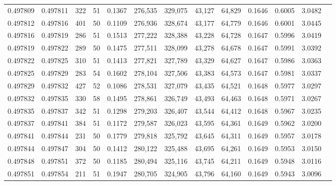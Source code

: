\begin{tabular}{rrrrrrrrrrrrr}
0.497809 & 0.497811 & 322 &  51 &                                     0.1367 & 276,535 & 329,075 &  43,127 &  64,829 & 0.1646 & 0.6005 & 3.0482 \\
0.497812 & 0.497816 & 401 &  50 &                                     0.1109 & 276,936 & 328,674 &  43,177 &  64,779 & 0.1646 & 0.6001 & 3.0445 \\
0.497816 & 0.497819 & 286 &  51 &                                     0.1513 & 277,222 & 328,388 &  43,228 &  64,728 & 0.1647 & 0.5996 & 3.0419 \\
0.497819 & 0.497822 & 289 &  50 &                                     0.1475 & 277,511 & 328,099 &  43,278 &  64,678 & 0.1647 & 0.5991 & 3.0392 \\
0.497822 & 0.497825 & 310 &  51 &                                     0.1413 & 277,821 & 327,789 &  43,329 &  64,627 & 0.1647 & 0.5986 & 3.0363 \\
0.497825 & 0.497829 & 283 &  54 &                                     0.1602 & 278,104 & 327,506 &  43,383 &  64,573 & 0.1647 & 0.5981 & 3.0337 \\
0.497829 & 0.497832 & 427 &  52 &                                     0.1086 & 278,531 & 327,079 &  43,435 &  64,521 & 0.1648 & 0.5977 & 3.0297 \\
0.497832 & 0.497835 & 330 &  58 &                                     0.1495 & 278,861 & 326,749 &  43,493 &  64,463 & 0.1648 & 0.5971 & 3.0267 \\
0.497835 & 0.497837 & 342 &  51 &                                     0.1298 & 279,203 & 326,407 &  43,544 &  64,412 & 0.1648 & 0.5967 & 3.0235 \\
0.497837 & 0.497841 & 384 &  51 &                                     0.1172 & 279,587 & 326,023 &  43,595 &  64,361 & 0.1649 & 0.5962 & 3.0200 \\
0.497841 & 0.497844 & 231 &  50 &                                     0.1779 & 279,818 & 325,792 &  43,645 &  64,311 & 0.1649 & 0.5957 & 3.0178 \\
0.497844 & 0.497847 & 304 &  50 &                                     0.1412 & 280,122 & 325,488 &  43,695 &  64,261 & 0.1649 & 0.5953 & 3.0150 \\
0.497848 & 0.497851 & 372 &  50 &                                     0.1185 & 280,494 & 325,116 &  43,745 &  64,211 & 0.1649 & 0.5948 & 3.0116 \\
0.497851 & 0.497854 & 211 &  51 &                                     0.1947 & 280,705 & 324,905 &  43,796 &  64,160 & 0.1649 & 0.5943 & 3.0096 \\

\end{tabular}
